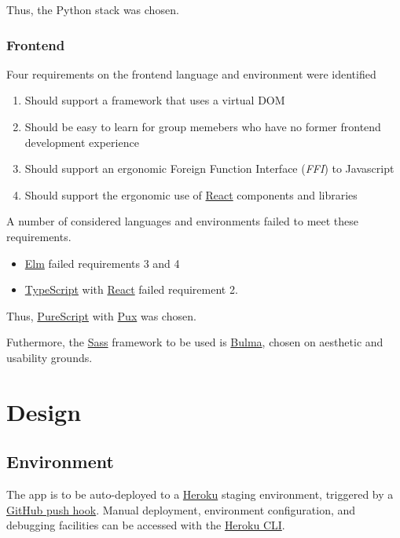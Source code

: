 \documentclass[8pt,a4paper]{report}
\begin{document}
Thus, the Python stack was chosen.

\subsection{Frontend}


Four requirements on the frontend language and environment were identified

\begin{enumerate}
    \item Should support a framework that uses a virtual DOM
    \item Should be easy to learn for group memebers who have no former frontend development experience
    \item Should support an ergonomic Foreign Function Interface (\textit{FFI}) to Javascript
    \item Should support the ergonomic use of \href{https://facebook.github.io/react/}{React} components and libraries
\end{enumerate}


A number of considered languages and environments failed to meet these requirements.


\begin{itemize}
    \item \href{http://elm-lang.org/}{Elm} failed requirements 3 and 4
    \item \href{https://www.typescriptlang.org/}{TypeScript} with \href{https://facebook.github.io/react/}{React} failed requirement 2.
\end{itemize}

Thus, \href{http://www.purescript.org/}{PureScript} with \href{http://www.purescript-pux.org/}{Pux} was chosen.

Futhermore, the \href{https://sass-lang.com/}{Sass} framework to be used is \href{http://bulma.io/}{Bulma}, chosen on aesthetic and usability grounds.


\chapter{Design}

\section{Environment}

The app is to be auto-deployed to a \href{https://www.heroku.com/}{Heroku} staging environment, triggered by a \href{https://devcenter.heroku.com/articles/github-integration}{GitHub push hook}. Manual deployment, environment configuration, and debugging facilities can be accessed with the \href{https://devcenter.heroku.com/articles/heroku-cli}{Heroku CLI}.
\end{document}
